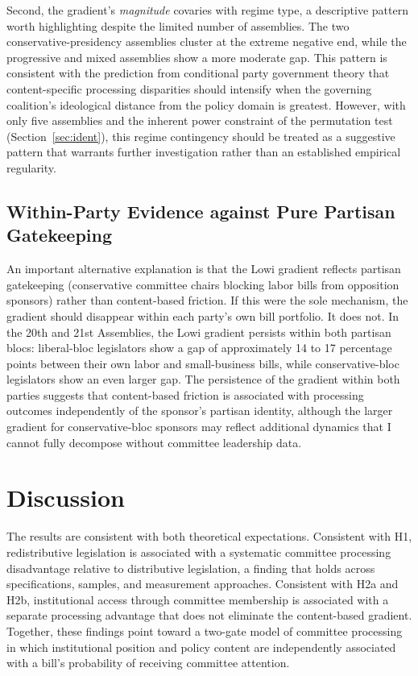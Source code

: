 \documentclass[11pt]{article}
\begin{document}
Second, the gradient's \emph{magnitude} covaries with regime type, a descriptive pattern worth highlighting despite the limited number of assemblies. The two conservative-presidency assemblies cluster at the extreme negative end, while the progressive and mixed assemblies show a more moderate gap. This pattern is consistent with the prediction from conditional party government theory \citep{aldrich2001} that content-specific processing disparities should intensify when the governing coalition's ideological distance from the policy domain is greatest. However, with only five assemblies and the inherent power constraint of the permutation test (Section~\ref{sec:ident}), this regime contingency should be treated as a suggestive pattern that warrants further investigation rather than an established empirical regularity.

\subsection{Within-Party Evidence against Pure Partisan Gatekeeping}
\label{sec:results-party}

An important alternative explanation is that the Lowi gradient reflects partisan gatekeeping (conservative committee chairs blocking labor bills from opposition sponsors) rather than content-based friction. If this were the sole mechanism, the gradient should disappear within each party's own bill portfolio. It does not. In the 20th and 21st Assemblies, the Lowi gradient persists within both partisan blocs: liberal-bloc legislators show a gap of approximately 14 to 17 percentage points between their own labor and small-business bills, while conservative-bloc legislators show an even larger gap. The persistence of the gradient within both parties suggests that content-based friction is associated with processing outcomes independently of the sponsor's partisan identity, although the larger gradient for conservative-bloc sponsors may reflect additional dynamics that I cannot fully decompose without committee leadership data.


\section{Discussion}
\label{sec:discussion}

The results are consistent with both theoretical expectations. Consistent with H1, redistributive legislation is associated with a systematic committee processing disadvantage relative to distributive legislation, a finding that holds across specifications, samples, and measurement approaches. Consistent with H2a and H2b, institutional access through committee membership is associated with a separate processing advantage that does not eliminate the content-based gradient. Together, these findings point toward a two-gate model of committee processing in which institutional position and policy content are independently associated with a bill's probability of receiving committee attention.
\end{document}
